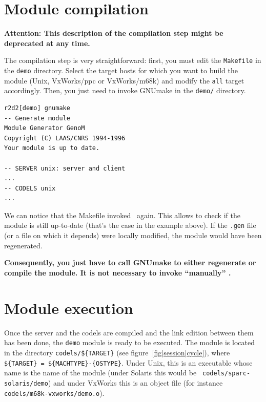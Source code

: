 \section{Module compilation}
\label{sec|session|compile}

{\bf Attention:   This  description  of  the   compilation step  might be
deprecated at any time.}

The  compilation step is  very straightforward: first,  you must edit the
{\tt Makefile} in the {\tt demo} directory.  Select  the target hosts for
which you  want to build the module   (Unix, VxWorks/ppc or VxWorks/m68k)
and  modify the  {\tt  all} target accordingly. Then,   you  just need to
invoke GNUmake in the {\tt demo/} directory.

\begin{center}
\begin{cartouche}\small
\begin{verbatim}
r2d2[demo] gnumake
-- Generate module
Module Generator GenoM
Copyright (C) LAAS/CNRS 1994-1996
Your module is up to date.

-- SERVER unix: server and client
...
-- CODELS unix
...
\end{verbatim}
\end{cartouche}
\end{center}

We can notice  that the Makefile  invoked  \GenoM\ again. This  allows to
check if the module  is still up-to-date  (that's the case in the example
above).  If the  {\tt .gen} file  (or  a file on   which it depends) were
locally modified, the module would have been regenerated.

{\bf Consequently, you just have to call  GNUmake to either regenerate or
compile the module. It is not necessary to invoke ``manually'' \GenoM.}


\section{Module execution}
\label{sec|session|exec}

Once the server and the codels are compiled and  the link edition between
them has been done,  the {\tt demo} module is  ready to be executed.  The
module is located in    the  directory {\tt  codels/\$\{TARGET\}}    (see
figure~\ref{fig|session|cycle}), where {\tt \$\{TARGET\} =
\$\{MACHTYPE\}-\{OSTYPE\}}. Under Unix, this is an executable whose name is
the   name   of the     module  (under  Solaris   this  would    be  {\tt
codels/sparc-solaris/demo})  and under  VxWorks   this is an object  file
(for instance  {\tt codels/m68k-vxworks/demo.o}).


